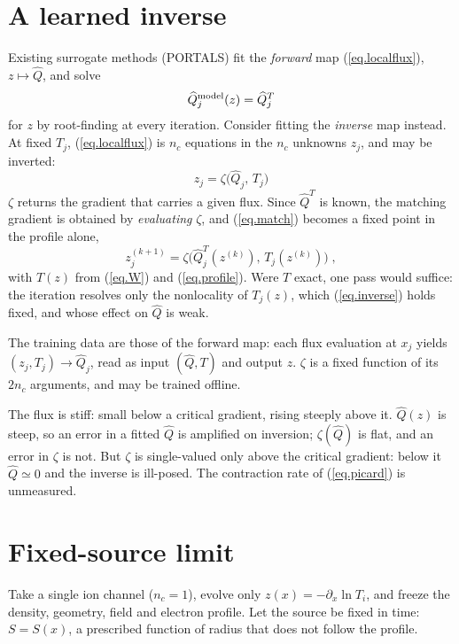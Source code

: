 \documentclass[12pt]{article}
\newcommand\qhat{\widehat{Q}}
\begin{document}
\section{A learned inverse}
\label{sec.inverse}

Existing surrogate methods (PORTALS) fit the {\it forward} map
(\ref{eq.localflux}), $z \mapsto \qhat$, and solve
%
\begin{equation}
\qhat^{\rm model}_j (z) = \qhat^T_j
\end{equation}
%
for $z$ by root-finding at every iteration.  Consider fitting the {\it
inverse} map instead.  At fixed $T_j$, (\ref{eq.localflux}) is $n_c$
equations in the $n_c$ unknowns $z_j$, and may be inverted:
%
\begin{equation}
\boxed{\;
z_j = \zeta \bigl( \qhat_j,\, T_j \bigr) \; }
\label{eq.inverse}
\end{equation}
%
$\zeta$ returns the gradient that carries a given flux.  Since $\qhat^T$
is known, the matching gradient is obtained by {\it evaluating} $\zeta$,
and (\ref{eq.match}) becomes a fixed point in the profile alone,
%
\begin{equation}
z^{(k+1)}_j = \zeta \bigl( \qhat^T_j(z^{(k)}),\, T_j(z^{(k)}) \bigr)
 \; ,
\label{eq.picard}
\end{equation}
%
with $T(z)$ from (\ref{eq.W}) and (\ref{eq.profile}).  Were $T$ exact,
one pass would suffice: the iteration resolves only the nonlocality of
$T_j(z)$, which (\ref{eq.inverse}) holds fixed, and whose effect on
$\qhat$ is weak.

The training data are those of the forward map: each flux evaluation at
$x_j$ yields $(z_j,T_j) \to \qhat_j$, read as input $(\qhat,T)$ and
output $z$.  $\zeta$ is a fixed function of its $2 n_c$ arguments, and
may be trained offline.

The flux is stiff: small below a critical gradient, rising steeply above
it.  $\qhat(z)$ is steep, so an error in a fitted $\qhat$ is amplified
on inversion; $\zeta(\qhat)$ is flat, and an error in $\zeta$ is not.
But $\zeta$ is single-valued only above the critical gradient: below it
$\qhat \simeq 0$ and the inverse is ill-posed.  The contraction rate of
(\ref{eq.picard}) is unmeasured.

\section{Fixed-source limit}
\label{sec.constsource}

Take a single ion channel ($n_c=1$), evolve only $z(x) = -\partial_x \ln
T_i$, and freeze the density, geometry, field and electron profile.  Let
the source be fixed in time: $S = S(x)$, a prescribed function of radius
that does not follow the profile.
\end{document}
